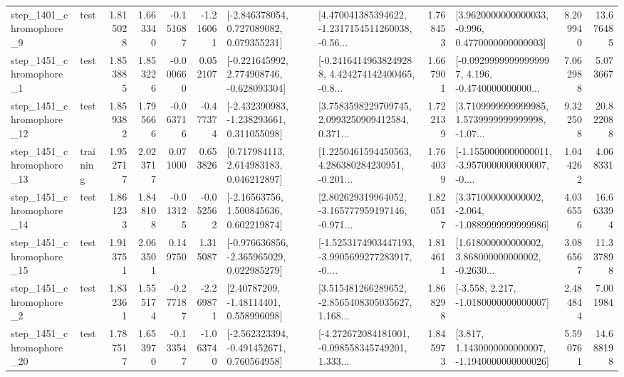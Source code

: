 \begin{tabular}{llrrrrllrlrr}
  step\_1401\_chromophore\_9 &      test &      1.815028 &    1.663340 &     -0.151687 & -1.216061 &    [-2.846378054, 0.727089082, 0.079355231] &  [4.470041385394622, -1.2317154511260038, -0.56... &       1.768453 &   [3.9620000000000033, -0.996, 0.4770000000000003] &            8.209940 &         13.676485 \\
  step\_1451\_chromophore\_1 &      test &      1.853885 &    1.853226 &     -0.000660 &  0.052107 &   [-0.221645992, 2.774908746, -0.628093304] &  [-0.24164149638249288, 4.424274142400465, -0.8... &       1.667901 &  [-0.09299999999999997, 4.196, -0.4740000000000... &            7.062988 &          5.073667 \\
 step\_1451\_chromophore\_12 &      test &      1.859382 &    1.795666 &     -0.063716 & -0.477374 &   [-2.432390983, -1.238293661, 0.311055098] &  [3.7583598229709745, 2.0993250909412584, 0.371... &       1.722139 &  [3.7109999999999985, 1.5739999999999998, -1.07... &            9.322508 &         20.822088 \\
 step\_1451\_chromophore\_13 &  training &      1.952717 &    2.023717 &      0.071000 &  0.653826 &     [0.717984113, 2.614983183, 0.046212897] &  [1.2250461594450563, 4.286380284230951, -0.201... &       1.764039 &  [-1.1550000000000011, -3.9570000000000007, -0.... &            1.044262 &          4.068331 \\
 step\_1451\_chromophore\_14 &      test &      1.861233 &    1.848108 &     -0.013125 & -0.052562 &     [-2.16563756, 1.500845636, 0.602219874] &  [2.802629319964052, -3.165777959197146, -0.971... &       1.820517 &   [3.371000000000002, -2.064, -1.0889999999999986] &            4.036556 &         16.663394 \\
 step\_1451\_chromophore\_15 &      test &      1.913751 &    2.063501 &      0.149750 &  1.315087 &   [-0.976636856, -2.365965029, 0.022985279] &  [-1.5253174903447193, -3.9905699277283917, -0.... &       1.814611 &  [1.618000000000002, 3.868000000000002, -0.2630... &            3.086567 &         11.337898 \\
  step\_1451\_chromophore\_2 &      test &      1.832361 &    1.555174 &     -0.277187 & -2.269871 &      [2.40787209, -1.48114401, 0.558996098] &  [3.515481266289652, -2.8565408305035627, 1.168... &       1.868298 &               [-3.558, 2.217, -1.0180000000000007] &            2.484844 &          7.001984 \\
 step\_1451\_chromophore\_20 &      test &      1.787517 &    1.653970 &     -0.133547 & -1.063740 &   [-2.562323394, -0.491452671, 0.760564958] &  [-4.272672084181001, -0.098558345749201, 1.333... &       1.845973 &   [3.817, 1.1430000000000007, -1.1940000000000026] &            5.590761 &         14.688198 \\

\end{tabular}
